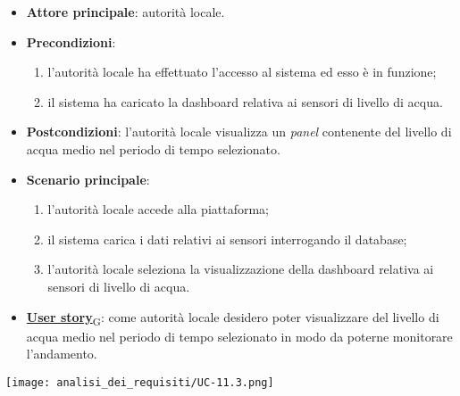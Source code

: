 \begin{itemize}
	\item \textbf{Attore principale}: autorità locale.
	\item \textbf{Precondizioni}:
	      \begin{enumerate}
		      \item l'autorità locale ha effettuato l'accesso al sistema ed esso è in funzione;
		      \item il sistema ha caricato la dashboard relativa ai sensori di livello di acqua.
	      \end{enumerate}
	\item \textbf{Postcondizioni}: l'autorità locale visualizza un \textit{panel} contenente del livello di acqua medio nel periodo di tempo selezionato.
	\item \textbf{Scenario principale}:
	      \begin{enumerate}
		      \item l'autorità locale accede alla piattaforma;
		      \item il sistema carica i dati relativi ai sensori interrogando il database;
		      \item l'autorità locale seleziona la visualizzazione della dashboard relativa ai sensori di livello di acqua.
	      \end{enumerate}
	\item \href{https://7last.github.io/docs/rtb/documentazione-interna/glossario\#user-story}{\textbf{User story}\textsubscript{G}}:
	      come autorità locale desidero poter visualizzare del livello di acqua medio nel periodo di tempo selezionato
	      in modo da poterne monitorare l'andamento.
\end{itemize}
\begin{center}
	\texttt{[image: analisi\_dei\_requisiti/UC-11.3.png]}
\end{center}


